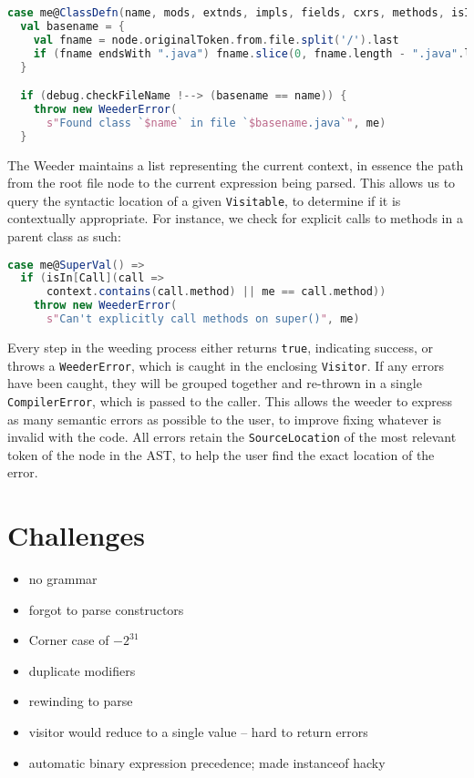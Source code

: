 \documentclass{article}
\begin{document}
\begin{lstlisting}[language=Scala]
case me@ClassDefn(name, mods, extnds, impls, fields, cxrs, methods, isInterface) =>
  val basename = {
    val fname = node.originalToken.from.file.split('/').last
    if (fname endsWith ".java") fname.slice(0, fname.length - ".java".length) else ""
  }

  if (debug.checkFileName !--> (basename == name)) {
    throw new WeederError(
      s"Found class `$name` in file `$basename.java`", me)
  }
\end{lstlisting}
The Weeder maintains a list representing the current context, in essence the path from
the root file node to the current expression being parsed. This allows us to query the syntactic
location of a given {\tt Visitable}, to determine if it is contextually appropriate. For instance,
we check for explicit calls to methods in a parent class as such:

\begin{lstlisting}[language=Scala]
case me@SuperVal() =>
  if (isIn[Call](call =>
      context.contains(call.method) || me == call.method))
    throw new WeederError(
      s"Can't explicitly call methods on super()", me)
\end{lstlisting}

Every step in the weeding process either returns {\tt true}, indicating success,
or throws a {\tt WeederError}, which is caught in the enclosing {\tt Visitor}. If any
errors have been caught, they will be grouped together and re-thrown in a single
{\tt CompilerError}, which is passed to the caller. This allows the weeder to express
as many semantic errors as possible to the user, to improve fixing whatever is invalid
with the code. All errors retain the {\tt SourceLocation} of the most relevant token of the
node in the AST, to help the user find the exact location of the error.
\section{Challenges}

\begin{itemize}
    \item no grammar
    \item forgot to parse constructors
    \item Corner case of $-2^{31}$
    \item duplicate modifiers
    \item rewinding to parse
    \item visitor would reduce to a single value -- hard to return errors
    \item automatic binary expression precedence; made instanceof hacky
\end{itemize}
\end{document}
